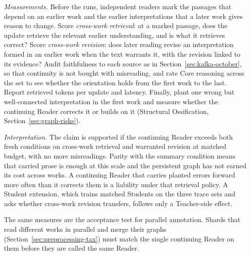 \documentclass[11pt]{article}
\begin{document}
\emph{Measurements.} Before the runs, independent readers mark the passages
that depend on an earlier work and the earlier interpretations that a later
work gives reason to change. Score \emph{cross-work retrieval}: at a marked
passage, does the update retrieve the relevant earlier understanding, and is
what it retrieves correct? Score \emph{cross-work revision}: does later reading
revise an interpretation formed in an earlier work when the text warrants it,
with the revision linked to its evidence? Audit faithfulness to each source as
in Section~\ref{sec:kafka-october}, so that continuity is not bought with
misreading, and rate Core reasoning across the set to see whether the
orientation holds from the first work to the last. Report retrieved tokens per
update and latency. Finally, plant one wrong but well-connected interpretation
in the first work and measure whether the continuing Reader corrects it or
builds on it (Structural Ossification, Section~\ref{sec:graph-risks}).

\emph{Interpretation.} The claim is supported if the continuing Reader exceeds
both fresh conditions on cross-work retrieval and warranted revision at
matched budget, with no more misreadings. Parity with the summary condition
means that carried prose is enough at this scale and the persistent graph has
not earned its cost across works. A continuing Reader that carries planted
errors forward more often than it corrects them is a liability under that
retrieval policy. A Student extension, which trains matched Students on the
three trace sets and asks whether cross-work revision transfers, follows only
a Teacher-side effect.

The same measures are the acceptance test for parallel annotation. Shards that
read different works in parallel and merge their graphs
(Section~\ref{sec:preprocessing-tax}) must match the single continuing Reader
on them before they are called the same Reader.
\end{document}
